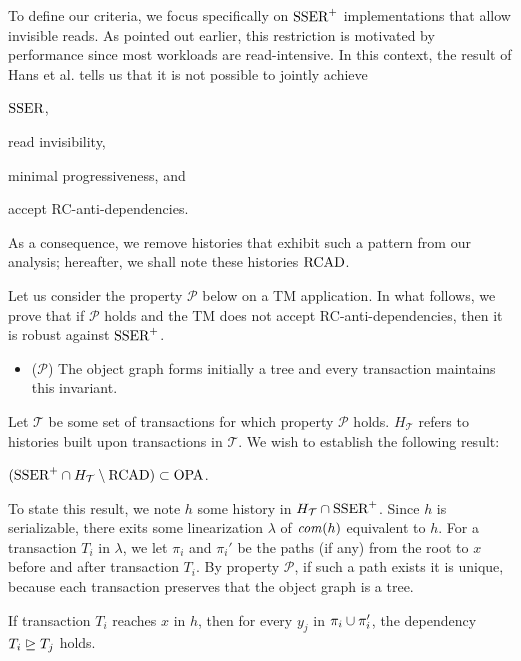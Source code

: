 To define our criteria, we focus specifically on $\SPSER$ implementations that allow invisible reads.
As pointed out earlier, this restriction is motivated by performance since most workloads are read-intensive.
In this context, the result of Hans et al. \cite{hans16} tells us that it is not possible to jointly achieve
\begin{inparaenum}
\item $\SSER$,
\item read invisibility,
\item minimal progressiveness, and
\item accept RC-anti-dependencies.
\end{inparaenum}
As a consequence, we remove histories that exhibit such a pattern from our analysis;
hereafter, we shall note these histories $\RCAD$.

Let us consider the property $\mathcal{P}$ below on a TM application.
In what follows, we prove that if $\mathcal{P}$ holds and the TM does not accept RC-anti-dependencies, then it is robust against $\SPSER$.
\begin{itemize}
  \item($\mathcal{P}$) The object graph forms initially a tree and every transaction maintains this invariant.
\end{itemize}
Let $\mathcal{T}$ be some set of transactions for which property $\mathcal{P}$ holds.
$H_{\mathcal{T}}$ refers to histories built upon transactions in $\mathcal{T}$.
We wish to establish the following result:

\begin{proposition}
  $(\SPSER \inter H_{\mathcal{T}} \setminus \RCAD) \subset \OPA$.
\end{proposition}

To state this result, we note $h$ some history  in $H_{\mathcal{T}} \inter \SPSER$.
Since $h$ is serializable, there exits some linearization $\lambda$ of $\committed{h}$ equivalent to $h$.
For a transaction $T_i$ in $\lambda$, we let $\pi_i$ and $\pi_i'$ be the paths (if any) from the root to $x$ before and after transaction $T_i$.
By property $\mathcal{P}$, if such a path exists it is unique, because each transaction preserves that the object graph is a tree.

\begin{lemma}
  If transaction $T_i$ reaches $x$ in $h$, then for every $y_j$ in $\pi_i \cup \pi_i'$, the dependency $T_i \mathrel{\unrhd} T_j$ holds. 
\end{lemma}

